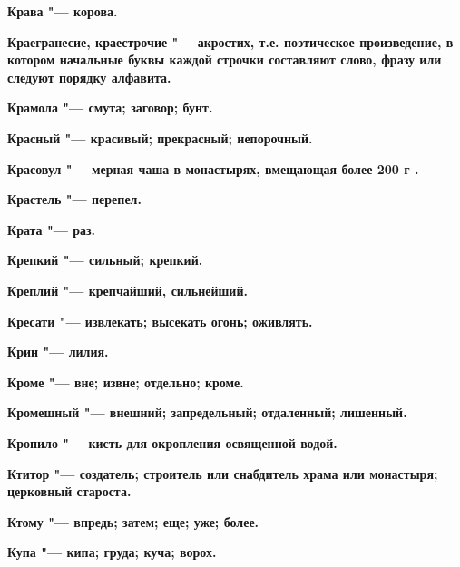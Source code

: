 \bfseries Крава \normalfont{} "--- корова. 




\bfseries Краегранесие, краестрочие \normalfont{} "--- акростих, т.е. поэтическое произведение, в котором начальные буквы каждой строчки составляют слово, фразу или следуют порядку алфавита. 




\bfseries Крамола \normalfont{} "--- смута; заговор; бунт. 




\bfseries Красный \normalfont{} "--- красивый; прекрасный; непорочный. 




\bfseries Красовул \normalfont{} "--- мерная чаша в монастырях, вмещающая более 200 г . 




\bfseries Крастель \normalfont{} "--- перепел. 




\bfseries Крата \normalfont{} "--- раз. 




\bfseries Крепкий \normalfont{} "--- сильный; крепкий. 




\bfseries Креплий \normalfont{} "--- крепчайший, сильнейший. 




\bfseries Кресати \normalfont{} "--- извлекать; высекать огонь; оживлять. 




\bfseries Крин \normalfont{} "--- лилия. 




\bfseries Кроме \normalfont{} "--- вне; извне; отдельно; кроме. 




\bfseries Кромешный \normalfont{} "--- внешний; запредельный; отдаленный; лишенный. 




\bfseries Кропило \normalfont{} "--- кисть для окропления освященной водой. 




\bfseries Ктитор \normalfont{} "--- создатель; строитель или снабдитель храма или монастыря; церковный староста. 




\bfseries Ктому \normalfont{} "--- впредь; затем; еще; уже; более. 




\bfseries Купа \normalfont{} "--- кипа; груда; куча; ворох. 




